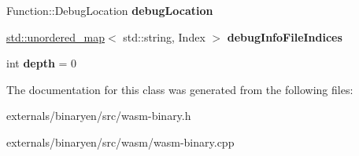 \begin{DoxyCompactItemize}
\item 
\mbox{\label{classwasm_1_1_wasm_binary_builder_ae46fa40914b481c6abc2991730d16b8a}} 
Function\+::\+Debug\+Location {\bfseries debug\+Location}
\item 
\mbox{\label{classwasm_1_1_wasm_binary_builder_a57e18df202c4cc0aeb932ba56c5f4048}} 
\mbox{\hyperlink{classstd_1_1unordered__map}{std\+::unordered\+\_\+map}}$<$ std\+::string, Index $>$ {\bfseries debug\+Info\+File\+Indices}
\item 
\mbox{\label{classwasm_1_1_wasm_binary_builder_a3d30f5e15e2df9471944d6f24a330a18}} 
int {\bfseries depth} = 0
\end{DoxyCompactItemize}


The documentation for this class was generated from the following files\+:\begin{DoxyCompactItemize}
\item 
externals/binaryen/src/wasm-\/binary.\+h\item 
externals/binaryen/src/wasm/wasm-\/binary.\+cpp\end{DoxyCompactItemize}
